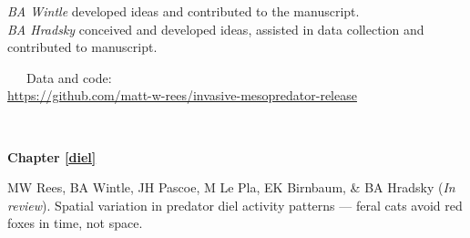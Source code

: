 \documentclass[11pt,a4paper,titlepage,twoside,openright]{style/unimelbthesis}
\begin{document}
\begin{frontmatter}
\begin{preface}
    \hspace*{0.333em}\hspace*{0.333em}\hspace*{0.333em}\hspace*{0.333em}\hspace*{0.333em}\hspace*{0.333em}\hspace*{0.333em}\hspace*{0.333em}\emph{BA Wintle} developed ideas and contributed to the manuscript.\\
    \hspace*{0.333em}\hspace*{0.333em}\hspace*{0.333em}\hspace*{0.333em}\hspace*{0.333em}\hspace*{0.333em}\hspace*{0.333em}\hspace*{0.333em}\emph{BA Hradsky} conceived and developed ideas, assisted in data collection and contributed to manuscript.

    ~~~Data and code:\\
    \url{https://github.com/matt-w-rees/invasive-mesopredator-release}

    \(~\)

    \textbf{Chapter \ref{diel}}

    MW Rees, BA Wintle, JH Pascoe, M Le Pla, EK Birnbaum, \& BA Hradsky (\emph{In review}). Spatial variation in predator diel activity patterns --- feral cats avoid red foxes in time, not space.


\end{preface}
\end{frontmatter}
\end{document}
